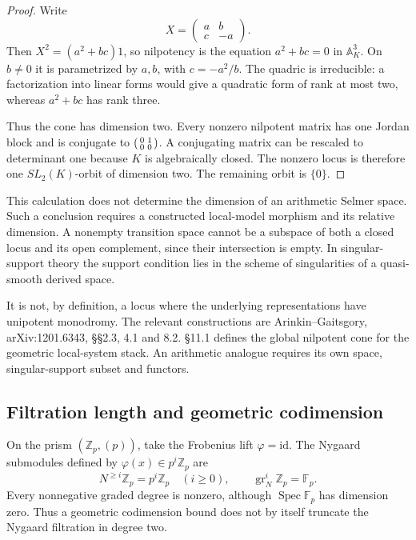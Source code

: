 \begin{proof}
Write
\[
 X=\begin{pmatrix}a&b\\c&-a\end{pmatrix}.
\]
Then $X^2=(a^2+bc)1$, so nilpotency is the equation
$a^2+bc=0$ in $\mathbb A_K^3$.
On $b\ne0$ it is parametrized by $a,b$, with $c=-a^2/b$.
The quadric is irreducible: a factorization into linear forms would
give a quadratic form of rank at most two, whereas $a^2+bc$ has
rank three.

Thus the cone has dimension two.
Every nonzero nilpotent matrix has one Jordan block and is
conjugate to $\begin{psmallmatrix}0&1\\0&0\end{psmallmatrix}$.
A conjugating matrix can be rescaled to determinant one because
$K$ is algebraically closed. The nonzero locus is therefore one
$SL_2(K)$-orbit of dimension two. The remaining orbit is $\{0\}$.
\end{proof}

\begin{remark}
\label{v4-arith:ic:w6-g:rem:codim-2-role}
This calculation does not determine the dimension of an arithmetic
Selmer space. Such a conclusion requires a constructed local-model
morphism and its relative dimension. A nonempty transition space
cannot be a subspace of both a closed locus and its open complement,
since their intersection is empty.
In singular-support theory the support condition lies in the scheme
of singularities of a quasi-smooth derived space.

It is not, by
definition, a locus where the underlying representations have
unipotent monodromy. The relevant constructions are
Arinkin--Gaitsgory, arXiv:1201.6343, \S\S2.3, 4.1 and 8.2.
\S11.1 defines the global nilpotent cone for the geometric
local-system stack. An arithmetic analogue requires its own
space, singular-support subset and functors.
\end{remark}

\subsection{Filtration length and geometric codimension}

\begin{example}
\label{v4-arith:ic:w6-g:thm:bl-2-convergence}
On the prism $(\mathbb Z_p,(p))$, take the Frobenius lift
$\varphi=\mathrm{id}$. The Nygaard submodules defined by
$\varphi(x)\in p^i\mathbb Z_p$ are
\[
 N^{\ge i}\mathbb Z_p=p^i\mathbb Z_p\quad(i\ge0),\qquad
 \operatorname{gr}_N^i\mathbb Z_p=\mathbb F_p.
\]
Every nonnegative graded degree is nonzero, although
$\operatorname{Spec}\mathbb F_p$ has dimension zero.
Thus a geometric codimension bound does not by itself truncate
the Nygaard filtration in degree two.
\end{example}

